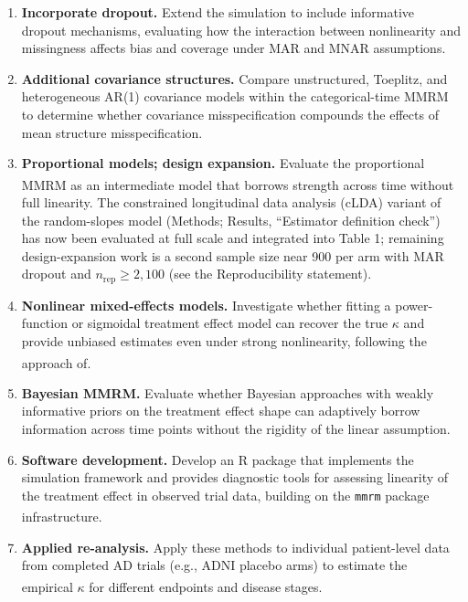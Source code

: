 \documentclass[
  11pt,
]{article}
\begin{document}
\begin{enumerate}
\def\labelenumi{\arabic{enumi}.}
\item
  \textbf{Incorporate dropout.} Extend the simulation to include
  informative dropout mechanisms, evaluating how the
  interaction between nonlinearity and missingness affects
  bias and coverage under MAR and MNAR assumptions.
\item
  \textbf{Additional covariance structures.} Compare unstructured,
  Toeplitz, and heterogeneous AR(1) covariance models
  within the categorical-time MMRM to determine whether
  covariance misspecification compounds the effects of mean
  structure misspecification.
\item
  \textbf{Proportional models; design expansion.} Evaluate the
  proportional MMRM\textsuperscript{} as an intermediate
  model that borrows strength across time without full
  linearity. The constrained longitudinal data analysis (cLDA)
  variant of the random-slopes model (Methods; Results,
  ``Estimator definition check'') has now been evaluated at full
  scale and integrated into Table 1; remaining design-expansion
  work is a second sample size near 900 per arm with MAR
  dropout and \(n_{\mathrm{rep}} \geq 2{,}100\) (see the
  Reproducibility statement).
\item
  \textbf{Nonlinear mixed-effects models.} Investigate whether
  fitting a power-function or sigmoidal treatment effect
  model can recover the true \(\kappa\) and provide unbiased
  estimates even under strong nonlinearity, following the
  approach of\textsuperscript{}.
\item
  \textbf{Bayesian MMRM.} Evaluate whether Bayesian approaches
  with weakly informative priors on the treatment effect
  shape can adaptively borrow information across time points
  without the rigidity of the linear assumption.
\item
  \textbf{Software development.} Develop an R package that
  implements the simulation framework and provides
  diagnostic tools for assessing linearity of the treatment
  effect in observed trial data, building on the \texttt{mmrm}
  package infrastructure\textsuperscript{}.
\item
  \textbf{Applied re-analysis.} Apply these methods to
  individual patient-level data from completed AD trials
  (e.g., ADNI placebo arms) to estimate the empirical
  \(\kappa\) for different endpoints and disease stages\textsuperscript{}.
\end{enumerate}
\end{document}
